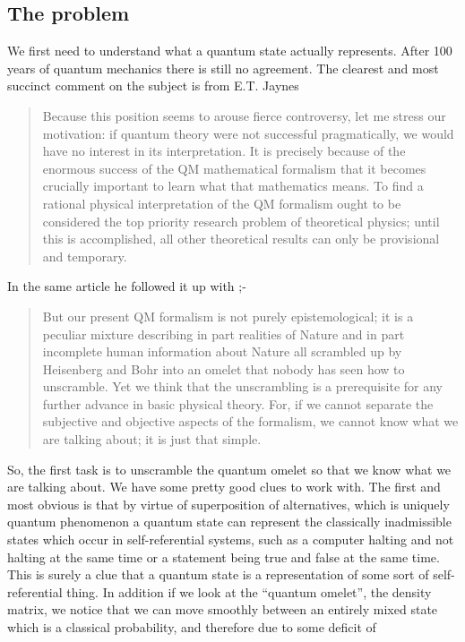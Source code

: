 \subsection{The problem}
We first need to understand what a quantum state actually represents. After 100 years of quantum
mechanics there is still no agreement. The clearest and most succinct comment on the subject is
from E.T. Jaynes \autocite{Jaynes_89_a}
\begin{quotation}
Because this position seems to arouse fierce controversy, let me stress our motivation: if
quantum theory were not successful pragmatically, we would have no interest in its
interpretation. It is precisely because of the enormous success of the QM mathematical formalism
that it becomes crucially important to learn what that mathematics means. To find a rational
physical interpretation of the QM formalism ought to be considered the top priority research
problem of theoretical physics; until this is accomplished, all other theoretical results can
only be provisional and temporary.
\end{quotation}
In the same article he followed it up with ;-
\begin{quotation}
But our present QM formalism is not purely epistemological; it is a peculiar mixture describing
in part realities of Nature and in part incomplete human information about Nature all scrambled
up by Heisenberg and Bohr into an omelet that nobody has seen how to unscramble. Yet we think
that the unscrambling is a prerequisite for any further advance in basic physical theory. For,
if we cannot separate the subjective and objective aspects of the formalism, we cannot know what
we are talking about; it is just that simple.
\end{quotation}
So, the first task is to unscramble the quantum omelet so that we know what we are talking
about. We have some pretty good clues to work with. The first and most obvious is that by virtue
of superposition of alternatives, which is uniquely quantum phenomenon a quantum state can
represent the classically inadmissible states which occur in self-referential systems, such as a
computer halting and not halting at the same time \autocite{szangolies_2020} or a statement
being true and false at the same time. This is surely a clue that a quantum state is a
representation of some sort of self-referential thing. In addition if we look at the
\enquote{quantum omelet}, the density matrix, we notice that we can move smoothly between an
entirely mixed state which is a classical probability, and therefore due to some deficit of
